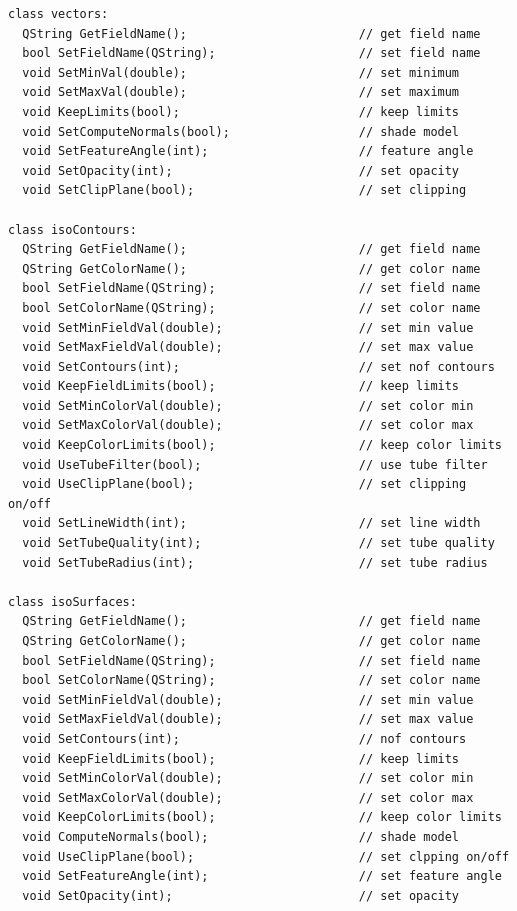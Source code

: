 \documentclass[a4paper,12pt]{article}
\begin{document}
\begin{footnotesize}
\begin{verbatim}
class vectors:
  QString GetFieldName();                        // get field name
  bool SetFieldName(QString);                    // set field name
  void SetMinVal(double);                        // set minimum
  void SetMaxVal(double);                        // set maximum
  void KeepLimits(bool);                         // keep limits
  void SetComputeNormals(bool);                  // shade model
  void SetFeatureAngle(int);                     // feature angle
  void SetOpacity(int);                          // set opacity
  void SetClipPlane(bool);                       // set clipping

class isoContours:
  QString GetFieldName();                        // get field name
  QString GetColorName();                        // get color name
  bool SetFieldName(QString);                    // set field name
  bool SetColorName(QString);                    // set color name
  void SetMinFieldVal(double);                   // set min value
  void SetMaxFieldVal(double);                   // set max value
  void SetContours(int);                         // set nof contours
  void KeepFieldLimits(bool);                    // keep limits
  void SetMinColorVal(double);                   // set color min
  void SetMaxColorVal(double);                   // set color max
  void KeepColorLimits(bool);                    // keep color limits
  void UseTubeFilter(bool);                      // use tube filter
  void UseClipPlane(bool);                       // set clipping on/off
  void SetLineWidth(int);                        // set line width
  void SetTubeQuality(int);                      // set tube quality
  void SetTubeRadius(int);                       // set tube radius

class isoSurfaces:
  QString GetFieldName();                        // get field name
  QString GetColorName();                        // get color name
  bool SetFieldName(QString);                    // set field name
  bool SetColorName(QString);                    // set color name
  void SetMinFieldVal(double);                   // set min value
  void SetMaxFieldVal(double);                   // set max value
  void SetContours(int);                         // nof contours
  void KeepFieldLimits(bool);                    // keep limits
  void SetMinColorVal(double);                   // set color min
  void SetMaxColorVal(double);                   // set color max
  void KeepColorLimits(bool);                    // keep color limits
  void ComputeNormals(bool);                     // shade model
  void UseClipPlane(bool);                       // set clpping on/off
  void SetFeatureAngle(int);                     // set feature angle
  void SetOpacity(int);                          // set opacity


\end{verbatim}
\end{footnotesize}
\end{document}
